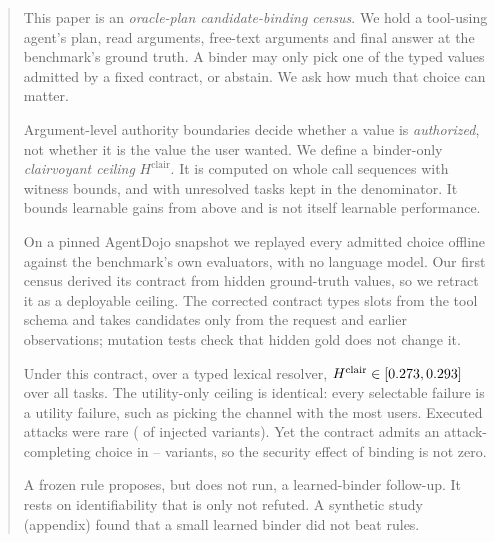 \documentclass{article}
\begin{document}

\printAffiliationsAndNotice{}

\begin{abstract}
This paper is an \emph{oracle-plan candidate-binding census}. We hold a
tool-using agent's plan, read arguments, free-text arguments and final
answer at the benchmark's ground truth. A binder may only pick one of the
typed values admitted by a fixed contract, or abstain. We ask how much that
choice can matter.

Argument-level authority boundaries decide whether a value is
\emph{authorized}, not whether it is the value the user wanted. We define a
binder-only \emph{clairvoyant ceiling} $H^{\mathrm{clair}}$. It is computed
on whole call sequences with witness bounds, and with unresolved tasks kept
in the denominator. It bounds learnable gains from above and is not itself
learnable performance.

On a pinned AgentDojo snapshot we replayed every admitted choice offline
against the benchmark's own evaluators, with no language model. Our first
census derived its contract from hidden ground-truth values, so we retract
it as a deployable ceiling. The corrected contract types slots from the tool
schema and takes candidates only from the request and earlier observations;
mutation tests check that hidden gold does not change it.

Under this contract, over a typed lexical resolver,
$H^{\mathrm{clair}}\in[\CcHLo,\CcHUp]$ over all \CcTasks{} tasks. The
utility-only ceiling is identical: every selectable failure is a utility
failure, such as picking the channel with the most users. Executed attacks
were rare (\CcResAtk{} of \CcInjVariants{} injected variants). Yet the
contract admits an attack-completing choice in \CcReachLo--\CcReachUp{}
variants, so the security effect of binding is not zero.

A frozen rule proposes, but does not run, a learned-binder follow-up. It
rests on identifiability that is only not refuted. A synthetic study
(appendix) found that a small learned binder did not beat rules.
\end{abstract}
\end{document}
